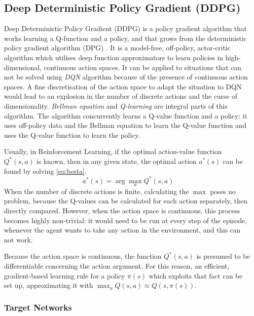 \subsection{Deep Deterministic Policy Gradient (DDPG)} \label{ddpg}

Deep Deterministic Policy Gradient (DDPG) \cite{lillicrap2015continuous} is a policy gradient algorithm that works learning a Q-function and a policy, and that grows from the deterministic policy gradient algorithm (DPG) \cite{silver2014deterministic}. It is a model-free, off-policy, actor-critic algorithm which utilises deep function approximators to learn policies in high-dimensional, continuous action spaces. It can be applied to situations that can not be solved using \textit{DQN} algorithm \cite{mnih2015human} because of the presence of continuous action spaces. A fine discretisation of the action space to adapt the situation to DQN would lead to an explosion in the number of discrete actions and the curse of dimensionality. 
\textit{Bellman equation} and \textit{Q-learning} are integral parts of this algorithm. The algorithm concurrently learns a Q-value function and a policy: it uses off-policy data and the Bellman equation to learn the Q-value function and uses the Q-value function to learn the policy.

Usually, in Reinforcement Learning, if the optimal action-value function $Q^*(s,a)$ is known, then in any given state, the optimal action $a^*(s)$ can be found by solving \vref{eq:besta}.
\begin{equation} \label{eq:besta}
	a^*(s) = \arg \max_a Q^*(s,a)
\end{equation}
When the number of discrete actions is finite, calculating the $\max$ poses no problem, because the Q-values can be calculated for each action separately, then directly compared. However, when the action space is continuous, this process becomes highly non-trivial: it would need to be run at every step of the episode, whenever the agent wants to take any action in the environment, and this can not work.

Because the action space is continuous, the function $Q^*(s,a)$ is presumed to be differentiable concerning the action argument. For this reason, an efficient, gradient-based learning rule for a policy $\pi(s)$ which exploits that fact can be set up, approximating it with $\max_a Q(s,a) \approx Q(s,\pi(s))$.

\subsubsection{Target Networks} \label{targetnet}

